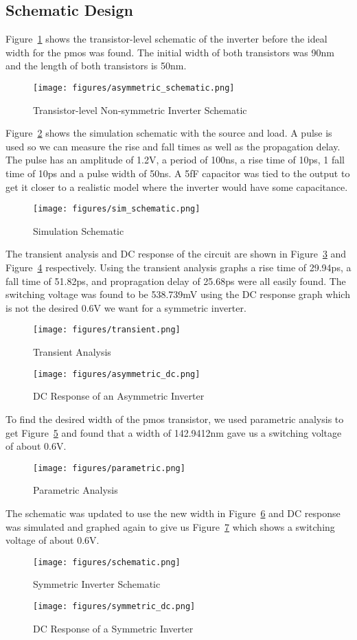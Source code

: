 \documentclass[12pt]{article}
\begin{document}
\subsection{Schematic Design}
Figure~\ref{fig:asymm_schem} shows the transistor-level schematic of the inverter before the ideal width for the pmos was found. The initial width of both transistors was 90nm and
the length of both transistors is 50nm.
\begin{figure}[!htb]
  \centering
  \texttt{[image: figures/asymmetric\_schematic.png]}
  \caption{Transistor-level Non-symmetric Inverter Schematic}\label{fig:asymm_schem}
\end{figure}
Figure~\ref{fig:sim_schem} shows the simulation schematic with the source and load. A pulse is used so we can measure the rise and fall times as well as the propagation delay. The
pulse has an amplitude of 1.2V, a period of 100ns, a rise time of 10ps, 1 fall time of 10ps and a pulse width of 50ns. A 5fF capacitor was tied to the output to get it closer to a
realistic model where the inverter would have some capacitance.
\begin{figure}[!htb]
  \centering
  \texttt{[image: figures/sim\_schematic.png]}
  \caption{Simulation Schematic}\label{fig:sim_schem}
\end{figure}
The transient analysis and DC response of the circuit are shown in Figure~\ref{fig:transient} and Figure~\ref{fig:asymm_dc} respectively. Using the transient analysis graphs a
rise time of 29.94ps, a fall time of 51.82ps, and propragation delay of 25.68ps were all easily found. The switching voltage was found to be 538.739mV using the DC response graph
which is not the desired 0.6V we want for a symmetric inverter.
\begin{figure}[!htb]
  \centering
  \texttt{[image: figures/transient.png]}
  \caption{Transient Analysis}\label{fig:transient}
\end{figure}
\begin{figure}[!htb]
  \centering
  \texttt{[image: figures/asymmetric\_dc.png]}
  \caption{DC Response of an Asymmetric Inverter}\label{fig:asymm_dc}
\end{figure}
To find the desired width of the pmos transistor, we used parametric analysis to get Figure~\ref{fig:parametric} and found that a width of 142.9412nm gave us a switching voltage of about 0.6V.
\begin{figure}[!htb]
  \centering
  \texttt{[image: figures/parametric.png]}
  \caption{Parametric Analysis}\label{fig:parametric}
\end{figure}
The schematic was updated to use the new width in Figure~\ref{fig:sym_schem} and DC response was simulated and graphed again to give us Figure~\ref{fig:sym_dc} which shows a switching voltage of about 0.6V.
\begin{figure}[!htb]
  \centering
  \texttt{[image: figures/schematic.png]}
  \caption{Symmetric Inverter Schematic}\label{fig:sym_schem}
\end{figure}
\begin{figure}[!htb]
  \centering
  \texttt{[image: figures/symmetric\_dc.png]}
  \caption{DC Response of a Symmetric Inverter}\label{fig:sym_dc}
\end{figure}
\end{document}
